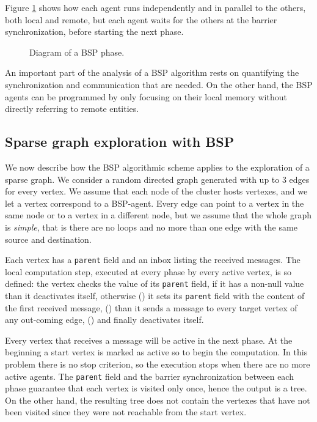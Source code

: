 \documentclass[a4paper]{article}
\numberwithin{equation}{section}
\begin{document}
Figure \ref{fig:bspDiagram} shows how each agent runs independently
and in parallel to the others, both local and remote, but each agent 
waits for the others at the 
barrier synchronization, before starting the next phase.

\begin{figure}[ht]
	\centering
	\caption{Diagram of a BSP phase.}
	\label{fig:bspDiagram}
\end{figure}

An important part of the analysis of a BSP algorithm rests on
quantifying the synchronization and communication that are needed. 
On the other hand, the BSP agents can be programmed by only focusing
on their local memory
without directly referring to remote entities.

\subsection{Sparse graph exploration with BSP}

We now describe how the BSP algorithmic scheme applies to the
exploration of a sparse graph. 
We consider a random directed graph generated with up to 3 edges for
every vertex. We assume that each node of the cluster hosts 
vertexes, and we let a vertex correspond to a BSP-agent. 
Every edge can point to a vertex in the same node or to a
vertex in a different node, but we assume that the whole graph
is \emph{simple}, that is there are no loops and no more than one
edge with the same source and destination.

Each vertex has a \verb+parent+ field and an inbox listing the
received messages. 
The local computation step, executed at every phase by every active
vertex, is so defined: 
the vertex checks the value of its \verb+parent+ field,
if it has a non-null value than it deactivates itself,
otherwise 
() it sets its \verb+parent+ field with the content of the
first received message, 
() than it sends a message to every target vertex of any out-coming
edge, 
()	and finally deactivates itself.

Every vertex that receives a message will be active in the next phase.
At the beginning a start vertex is marked as active so to begin the
computation. In this problem there is no stop criterion, so the
execution stops when there are no more active agents.
The \verb+parent+ field and the barrier synchronization between each
phase guarantee that each vertex is visited only once, hence the
output is a tree. On the other hand, the resulting tree does not
contain the vertexes that have not been visited since they were not
reachable from the start vertex. 
\end{document}
